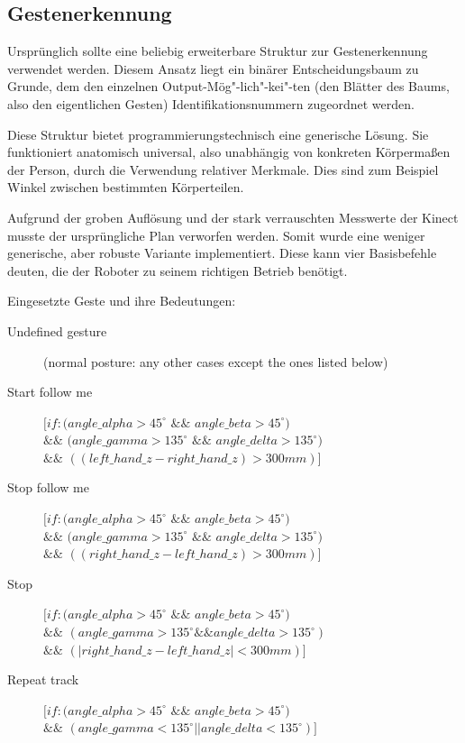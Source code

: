 \subsection{Gestenerkennung}
\label{gestenerkennung_gestenerkennung_sec}

Ursprünglich sollte eine beliebig erweiterbare Struktur zur Gestenerkennung verwendet werden.
 Diesem Ansatz liegt ein binärer Entscheidungsbaum zu Grunde, dem den einzelnen
 Output-Mög"-lich"-kei"-ten (den Blätter des Baums, also den eigentlichen
 Gesten) Identifikationsnummern zugeordnet werden.

Diese Struktur bietet programmierungstechnisch eine generische Lösung. Sie funktioniert anatomisch universal,
 also unabhängig von konkreten Körpermaßen der Person, durch die Verwendung relativer Merkmale.
 Dies sind zum Beispiel Winkel zwischen bestimmten Körperteilen.
 
Aufgrund der groben Auflösung und der stark verrauschten Messwerte der Kinect musste der ursprüngliche Plan verworfen werden.
 Somit wurde eine weniger generische, aber robuste Variante implementiert. Diese kann vier Basisbefehle deuten, die der Roboter zu seinem richtigen Betrieb benötigt.
\vspace{0.3cm}

\noindent Eingesetzte Geste und ihre Bedeutungen:
\begin{description}
  \item[Undefined gesture] (normal posture: any other cases except the ones
  listed below)
  \item[Start follow me] 
  $[if: (angle\_alpha > 45^\circ$ $\&\&$ $angle\_beta >
  45^\circ)$\\
  $\&\&$ $(angle\_gamma > 135^\circ$ $\&\&$ $angle\_delta >
  135^\circ)$\\
  $\&\&$ $((left\_hand\_z - right\_hand\_z) > 300 mm)]$
  \item[Stop follow me] $[if: (angle\_alpha > 45^\circ$ $\&\&$ $angle\_beta >
  45^\circ)$\\
  $\&\&$ $(angle\_gamma > 135^\circ$ $\&\&$ $angle\_delta > 135^\circ)$\\
  $\&\&$ $((right\_hand\_z - left\_hand\_z) > 300 mm)]$
  \item[Stop] $[if: (angle\_alpha > 45^\circ$ $\&\&$ $angle\_beta > 45^\circ)$\\
  $\&\&$ $(angle\_gamma > 135^\circ \&\& angle\_delta > 135^\circ)$\\
  $\&\&$ $(|right\_hand\_z - left\_hand\_z| < 300 mm)]$
  \item[Repeat track] $[if: (angle\_alpha > 45^\circ$ $\&\&$ $angle\_beta >
  45^\circ)$\\
  $\&\&$ $(angle\_gamma < 135^\circ || angle\_delta < 135^\circ)]$
\end{description}


